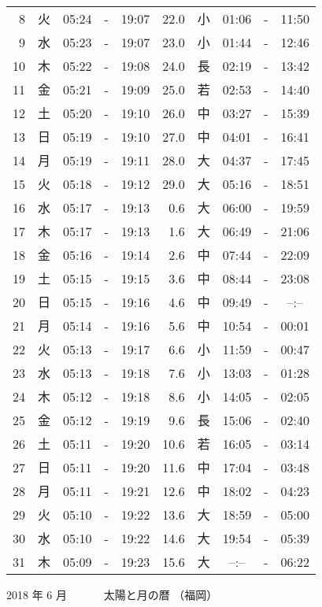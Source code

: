 \documentclass[a4j,10pt]{jsarticle}
\begin{document}
\begin{center}
\begin{table}[ht]
\begin{center}
\begin{tabular}{|rc|ccc|rc|ccc|}
  8 & 火 & 05:24 &-& 19:07 & 22.0 & 小 & 01:06 &-& 11:50 \\
  9 & 水 & 05:23 &-& 19:07 & 23.0 & 小 & 01:44 &-& 12:46 \\
 10 & 木 & 05:22 &-& 19:08 & 24.0 & 長 & 02:19 &-& 13:42 \\
 11 & 金 & 05:21 &-& 19:09 & 25.0 & 若 & 02:53 &-& 14:40 \\
 12 & 土 & 05:20 &-& 19:10 & 26.0 & 中 & 03:27 &-& 15:39 \\
 13 & 日 & 05:19 &-& 19:10 & 27.0 & 中 & 04:01 &-& 16:41 \\
 14 & 月 & 05:19 &-& 19:11 & 28.0 & 大 & 04:37 &-& 17:45 \\
 15 & 火 & 05:18 &-& 19:12 & 29.0 & 大 & 05:16 &-& 18:51 \\
 16 & 水 & 05:17 &-& 19:13 &  0.6 & 大 & 06:00 &-& 19:59 \\
 17 & 木 & 05:17 &-& 19:13 &  1.6 & 大 & 06:49 &-& 21:06 \\
 18 & 金 & 05:16 &-& 19:14 &  2.6 & 中 & 07:44 &-& 22:09 \\
 19 & 土 & 05:15 &-& 19:15 &  3.6 & 中 & 08:44 &-& 23:08 \\
 20 & 日 & 05:15 &-& 19:16 &  4.6 & 中 & 09:49 &-& --:-- \\
 21 & 月 & 05:14 &-& 19:16 &  5.6 & 中 & 10:54 &-& 00:01 \\
 22 & 火 & 05:13 &-& 19:17 &  6.6 & 小 & 11:59 &-& 00:47 \\
 23 & 水 & 05:13 &-& 19:18 &  7.6 & 小 & 13:03 &-& 01:28 \\
 24 & 木 & 05:12 &-& 19:18 &  8.6 & 小 & 14:05 &-& 02:05 \\
 25 & 金 & 05:12 &-& 19:19 &  9.6 & 長 & 15:06 &-& 02:40 \\
 26 & 土 & 05:11 &-& 19:20 & 10.6 & 若 & 16:05 &-& 03:14 \\
 27 & 日 & 05:11 &-& 19:20 & 11.6 & 中 & 17:04 &-& 03:48 \\
 28 & 月 & 05:11 &-& 19:21 & 12.6 & 中 & 18:02 &-& 04:23 \\
 29 & 火 & 05:10 &-& 19:22 & 13.6 & 大 & 18:59 &-& 05:00 \\
 30 & 水 & 05:10 &-& 19:22 & 14.6 & 大 & 19:54 &-& 05:39 \\
 31 & 木 & 05:09 &-& 19:23 & 15.6 & 大 & --:-- &-& 06:22 \\
\hline
\end{tabular}
\end{center}
\end{table}
\newpage
{\large 2018 年  6 月}
{\Large 　　　太陽と月の暦   （福岡） }

\end{center}
\end{document}
